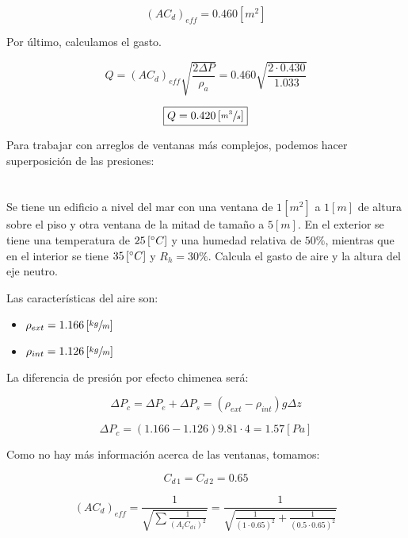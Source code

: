 \documentclass[11pt]{article}
\begin{document}
\[ \left( AC_d \right) _{ eff } = 0.460 \left[ m^2 \right] \]

Por último, calculamos el gasto.

\[ Q = \left( AC_d \right) _{ eff } \sqrt{ \frac{ 2 \Delta P }{ \rho _a } } = 0.460 \sqrt{ \frac{ 2 \cdot 0.430 }{ 1.033 } } \]

\[ \boxed{ Q = 0.420 \left[ \sfrac{ m^3 }{ s } \right] } \]

Para trabajar con arreglos de ventanas más complejos, podemos hacer superposición de las presiones:

\section{}

Se tiene un edificio a nivel del mar con una ventana de $ 1 \left[ m^2 \right] $ a $ 1 \left[ m \right] $ de altura sobre el piso y otra ventana de la mitad de tamaño a $ 5 \left[ m \right] $. En el exterior se tiene una temperatura de $ 25 \left[ \degree C \right] $ y una humedad relativa de $ 50\% $, mientras que en el interior se tiene $ 35 \left[ \degree C \right] $ y $ R_h = 30\% $. Calcula el gasto de aire y la altura del eje neutro.


Las características del aire son:

\begin{itemize}
    \item
    $ \rho _{ ext } = 1.166 \left[ \sfrac{ kg }{ m } \right] $

    \item
    $ \rho _{ int } = 1.126 \left[ \sfrac{ kg }{ m } \right] $

\end{itemize}

La diferencia de presión por efecto chimenea será:

\[ \Delta P_c = \Delta P_e + \Delta P_s = \left( \rho _{ ext } - \rho _{ int } \right) g \Delta z \]

\[ \Delta P_c = \left( 1.166 - 1.126 \right) 9.81 \cdot 4 = 1.57 \left[ Pa \right] \]

Como no hay más información acerca de las ventanas, tomamos:

\[ C_{ d \, 1 } = C_{ d \, 2 } = 0.65 \]

\[ \left( AC_d \right) _{ eff } = \frac{ 1 }{ \sqrt{ \sum{ \frac{ 1 }{ \left(  A_i C_{ d \, i } \right) ^2 } } } } = \frac{ 1 }{ \sqrt{ \frac{ 1 }{ \left( 1 \cdot 0.65 \right) ^2 } + \frac{ 1 }{ \left( 0.5 \cdot 0.65 \right) ^2 } } } \]
\end{document}
